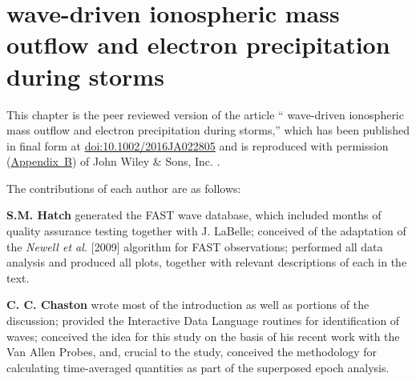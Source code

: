 
\chapter{\Alf wave-driven ionospheric mass outflow
and electron precipitation during storms}
\label{chp:2}

This chapter is the peer reviewed version of the article ``\Alf
wave-driven ionospheric mass outflow and electron precipitation during
storms,'' which has been published in final form at
\href{https://doi.org/10.1002/2016JA022805}{doi:10.1002/2016JA022805}
and is reproduced with permission (\hyperref[app:B]{Appendix~B}) of
John Wiley \& Sons, Inc. .

The contributions of each author are as follows:

\textbf{S.M. Hatch} generated the FAST \Alf wave database, which
included months of quality assurance testing together with J. LaBelle;
conceived of the adaptation of the \textsl{Newell et al.} [2009]
algorithm for FAST observations; performed all data analysis and
produced all plots, together with relevant descriptions of each in the
text.

\textbf{C. C. Chaston} wrote most of the introduction as well as
portions of the discussion; provided the Interactive Data Language
routines for identification of \Alf waves; conceived the idea for this
study on the basis of his recent work with the Van Allen Probes, and,
crucial to the study, conceived the methodology for calculating
time-averaged quantities as part of the superposed epoch analysis.

